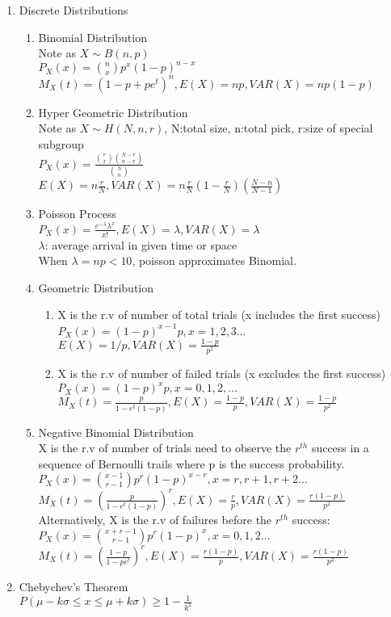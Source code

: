 \documentclass[10pt]{article}
\begin{document}
\begin{multicols}{2}
\begin{enumerate}
			\item Discrete Distributions
			\begin{enumerate}
				\item Binomial Distribution\\
				Note as $X \sim B(n,p)$\\
				$P_X(x) = {n \choose x} p^x (1-p)^{n-x}$\\
				$M_X(t) = (1-p+pe^t)^n, E(X) = np, VAR(X) = np(1-p)$
				\item Hyper Geometric Distribution\\
				Note as $X \sim H(N,n,r)$, N:total size, n:total pick, r:size of special subgroup\\
				$P_X(x) = \frac{{r \choose x}{N-r \choose n-x}}{{N \choose n}}$\\
				$E(X) = n\frac{r}{N}, VAR(X) = n\frac{r}{N}(1-\frac{r}{N})(\frac{N-n}{N-1})$
				\item Poisson Process\\
				$P_X(x) = \frac{e^{-\lambda}\lambda^x}{x!}, E(X) = \lambda, VAR(X) = \lambda$\\
				$\lambda$: average arrival in given time or space\\
				When $\lambda = np < 10$, poisson approximates Binomial.
				\item Geometric Distribution
				\begin{enumerate}
					\item X is the r.v of number of total trials (x includes the first success)\\
					$P_X(x) = (1-p)^{x-1}p, x = 1,2,3 \dots$\\
					$E(X) = 1/p, VAR(X) = \frac{1-p}{p^2}$
					\item X is the r.v of number of failed trials (x excludes the first success)\\
					$P_X(x) = (1-p)^xp, x = 0,1,2,\dots$\\
					$M_X(t) = \frac{p}{1-e^t(1-p)}, E(X) = \frac{1-p}{p}, VAR(X) = \frac{1-p}{p^2}$
				\end{enumerate}
				\item Negative Binomial Distribution\\
				X is the r.v of number of trials need to observe the $r^{th}$ success in a sequence of Bernoulli trails where p is the success probability.\\
				$P_X(x) = {x-1 \choose r-1}p^r(1-p)^{x-r}, x = r,r+1,r+2 \dots$\\
				$M_X(t) = (\frac{p}{1-e^t(1-p)})^r, E(X) = \frac{r}{p}, VAR(X) = \frac{r(1-p)}{p^2}$\\
				Alternatively, X is the r.v of failures before the $r^{th}$ success:\\
				$P_X(x) = {x+r-1 \choose r-1}p^r(1-p)^x, x = 0,1,2 \dots$\\
				$M_X(t) = (\frac{1-p}{1-pe^t})^r, E(X) = \frac{r(1-p)}{p}, VAR(X) = \frac{r(1-p)}{p^2}$
			\end{enumerate}
			\item Chebychev's Theorem\\
			$P(\mu-k\sigma \le x \le \mu+k\sigma) \ge 1-\frac{1}{k^2}$
		

\end{enumerate}
\end{multicols}
\end{document}
